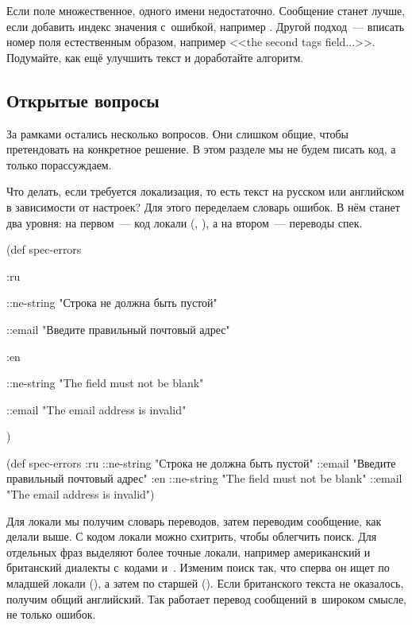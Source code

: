 \fi

Если поле множественное, одного имени недостаточно. Сообщение станет лучше, если
добавить индекс значения с~ошибкой, например . Другой подход~---
вписать номер поля естественным образом, например <<the second tags
field...>>. Подумайте, как ещё улучшить текст и доработайте алгоритм.

\subsection{Открытые вопросы}

За рамками остались несколько вопросов. Они слишком общие, чтобы претендовать на
конкретное решение. В этом разделе мы не будем писать код, а только
порассуждаем.

Что делать, если требуется локализация, то есть текст на русском или английском
в зависимости от настроек? Для этого переделаем словарь ошибок. В нём станет два
уровня: на первом~--- код локали (, ), а на втором~---
переводы спек.

\ifafive\vspace{10mm}\pagebreak[4]\fi

\ifnarrow

\begin{clojure}
(def spec-errors
 {:ru
  {::ne-string
   "Строка не должна быть пустой"

   ::email
   "Введите правильный почтовый адрес"}

  :en
  {::ne-string
   "The field must not be blank"

   ::email
   "The email address is invalid"}})
\end{clojure}

\else

\begin{clojure}
(def spec-errors
  {:ru {::ne-string "Строка не должна быть пустой"
        ::email "Введите правильный почтовый адрес"}
   :en {::ne-string "The field must not be blank"
        ::email "The email address is invalid"}})
\end{clojure}

\fi


Для локали мы получим словарь переводов, затем переводим сообщение, как делали
выше. С кодом локали можно схитрить, чтобы облегчить поиск. Для отдельных фраз
выделяют более точные локали, например американский и британский диалекты
с~кодами  и~. Изменим поиск так, что сперва он ищет по
младшей локали (), а затем по старшей (). Если британского
текста не оказалось, получим общий английский. Так работает перевод сообщений
в~широком смысле, не только ошибок.

